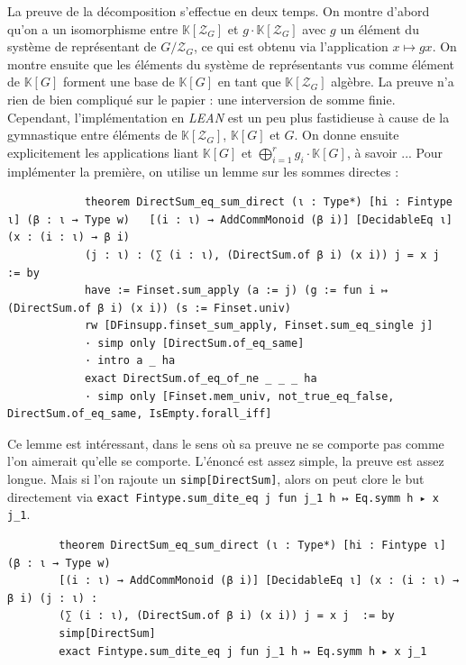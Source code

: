 \documentclass[10pt]{article}
\theoremstyle{definition}
\begin{document}
La preuve de la décomposition s'effectue en deux temps. On montre d'abord qu'on a un isomorphisme entre $\mathbb{K}[\mathcal{Z}_G]$ et $g\cdot \mathbb{K}[\mathcal{Z}_G]$ avec $g$ un élément du système de représentant de $G/\mathcal{Z}_G$, ce qui est obtenu via l'application $x\mapsto gx$. 
\newline
On montre ensuite que les éléments du système de représentants vus comme élément de $\mathbb{K}[G]$ forment une base de $\mathbb{K}[G]$ en tant que $\mathbb{K}[\mathcal{Z}_G]$ algèbre. La preuve n'a rien de bien compliqué sur le papier : une interversion de somme finie. Cependant, l'implémentation en \textit{LEAN} est un peu plus fastidieuse à cause de la gymnastique entre éléments de $\mathbb{K}[\mathcal{Z}_G]$, $\mathbb{K}[G]$ et $G$. 
On donne ensuite explicitement les applications liant $\mathbb{K}[G]$ et $\bigoplus\limits_{i=1}^rg_i\cdot\mathbb{K}[G]$, à savoir ...
 Pour implémenter la première, on utilise  un lemme sur les sommes directes : 
\begin{center}
	\begin{tcolorbox}[title = $L\exists\forall N$,width=12cm,text width=14cm,colback=lightgray!30,
		colframe=gray,sharp corners,
		rounded corners=uphill ]
		\begin{lstlisting}
			theorem DirectSum_eq_sum_direct (ι : Type*) [hi : Fintype ι] (β : ι → Type w)	[(i : ι) → AddCommMonoid (β i)] [DecidableEq ι] (x : (i : ι) → β i) 
			(j : ι) : (∑ (i : ι), (DirectSum.of β i) (x i)) j = x j  := by
			have := Finset.sum_apply (a := j) (g := fun i ↦ (DirectSum.of β i) (x i)) (s := Finset.univ)
			rw [DFinsupp.finset_sum_apply, Finset.sum_eq_single j]
			· simp only [DirectSum.of_eq_same]
			· intro a _ ha
			exact DirectSum.of_eq_of_ne _ _ _ ha
			· simp only [Finset.mem_univ, not_true_eq_false, DirectSum.of_eq_same, IsEmpty.forall_iff]
		\end{lstlisting}
	\end{tcolorbox}
\end{center}
Ce lemme est intéressant, dans le sens où sa preuve ne se comporte pas comme l'on aimerait qu'elle se comporte. L'énoncé est assez simple, la preuve est assez longue. Mais si l'on rajoute un \lstinline|simp[DirectSum]|, alors on peut clore le but directement via \lstinline|exact Fintype.sum_dite_eq j fun j_1 h ↦ Eq.symm h ▸ x j_1|. 
\begin{center}
	\begin{tcolorbox}[title = $L\exists\forall N$,width=12cm,text width=14cm,colback=lightgray!30,
		colframe=gray,sharp corners,
		rounded corners=uphill ]
		\begin{lstlisting}
		theorem DirectSum_eq_sum_direct (ι : Type*) [hi : Fintype ι] (β : ι → Type w)
		[(i : ι) → AddCommMonoid (β i)] [DecidableEq ι] (x : (i : ι) → β i) (j : ι) :
		(∑ (i : ι), (DirectSum.of β i) (x i)) j = x j  := by
		simp[DirectSum]
		exact Fintype.sum_dite_eq j fun j_1 h ↦ Eq.symm h ▸ x j_1
		\end{lstlisting}
	\end{tcolorbox}
\end{center}
\end{document}
